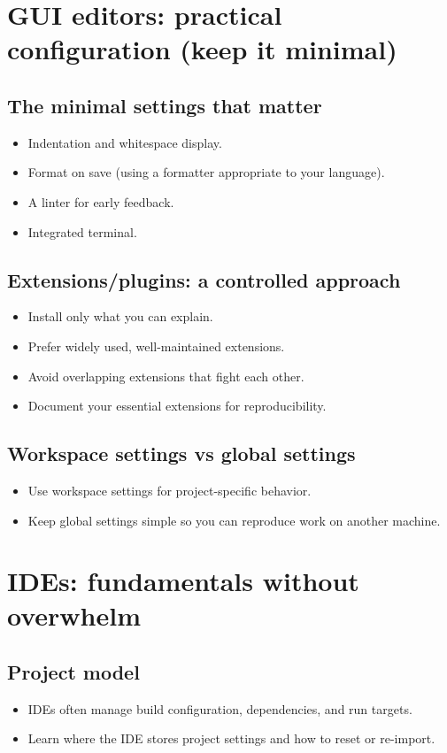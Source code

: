 \section{GUI editors: practical configuration (keep it minimal)}
\subsection{The minimal settings that matter}
\begin{itemize}
\item Indentation and whitespace display.
\item Format on save (using a formatter appropriate to your language).
\item A linter for early feedback.
\item Integrated terminal.
\end{itemize}

\subsection{Extensions/plugins: a controlled approach}
\begin{itemize}
\item Install only what you can explain.
\item Prefer widely used, well-maintained extensions.
\item Avoid overlapping extensions that fight each other.
\item Document your essential extensions for reproducibility.
\end{itemize}

\subsection{Workspace settings vs global settings}
\begin{itemize}
\item Use workspace settings for project-specific behavior.
\item Keep global settings simple so you can reproduce work on another machine.
\end{itemize}

\section{IDEs: fundamentals without overwhelm}
\subsection{Project model}
\begin{itemize}
\item IDEs often manage build configuration, dependencies, and run targets.
\item Learn where the IDE stores project settings and how to reset or re-import.
\end{itemize}

